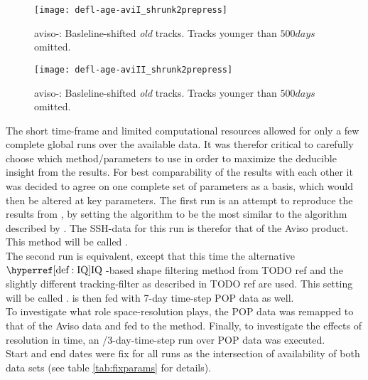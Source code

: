 \begin{figure}
		\texttt{[image: defl-age-aviI\_shrunk2prepress]}
		\caption{aviso-\MI: Basleline-shifted \textit{old} tracks. Tracks younger than $500 days$ omitted.}
		\label{fig:defl-age-aviI_shrunk2prepress}
\end{figure}
\begin{figure}
		\texttt{[image: defl-age-aviII\_shrunk2prepress]}
		\caption{aviso-\MII: Basleline-shifted \textit{old} tracks. Tracks younger than $500 days$ omitted.}
		\label{fig:defl-age-aviII_shrunk2prepress}
\end{figure}

The short time-frame and limited computational resources allowed for only a few complete global runs over the available data.
It was therefor critical to carefully choose which method/parameters to use in order to maximize the deducible insight from the results.
For best comparability of the results with each other it was decided to agree on one complete set of parameters as a basis, which would then be altered at key parameters.
The first run is an attempt to reproduce the results from \citet{Chelton2011}, by setting the algorithm to be the most similar to the algorithm described by .  The SSH-data for this run is therefor that of the Aviso product.
This method will be called \MI.\\
 The second run is equivalent, except that this time the alternative $\IQ$-based shape filtering method from TODO ref and the slightly different tracking-filter as described in TODO ref are used. This setting will be called \MII. \MII is then fed with 7-day time-step POP data as well.\\
 To investigate what role space-resolution plays, the POP data was remapped to that of the Aviso data and fed to the \MI method. Finally, to investigate the effects of resolution in time, an \MII/3-day-time-step run over POP data was executed.  \\
  Start and end dates were fix for all runs as the intersection of availability of both data sets (see table \ref{tab:fixparams} for details).

